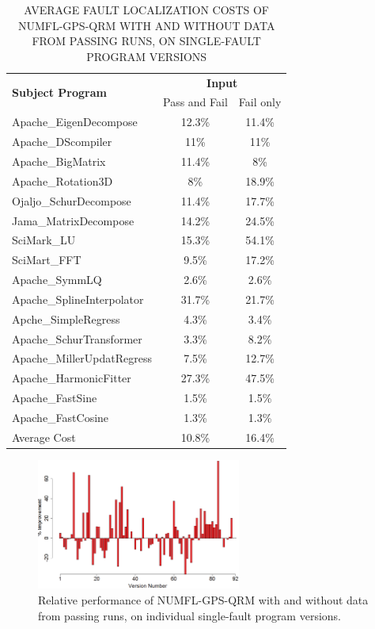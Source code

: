 \begin{table}[htbp!]
\caption{AVERAGE FAULT LOCALIZATION COSTS OF NUMFL-GPS-QRM WITH AND WITHOUT DATA FROM PASSING RUNS, ON SINGLE-FAULT PROGRAM VERSIONS}
\label{table3}
\centering
      \begin{tabular}{|l|c|c|}
      \hline
\multirow{2}{*}{{\bf Subject Program}}	&	\multicolumn{2}{|c|}{{\bf Input}}	\\	\cline{2-3}
& Pass and Fail	&Fail only \\ \hline
Apache\_EigenDecompose	&	12.3\%	&	11.4\%	\\	\hline
Apache\_DScompiler	&	11\%	&	11\%	\\	\hline
Apache\_BigMatrix	&	11.4\%	&	8\%	\\	\hline
Apache\_Rotation3D	&	8\%	&	18.9\%	\\	\hline
Ojaljo\_SchurDecompose	&	11.4\%	&	17.7\%	\\	\hline
Jama\_MatrixDecompose	&	14.2\%	&	24.5\%	\\	\hline
SciMark\_LU	&	15.3\%	&	54.1\%	\\	\hline
SciMart\_FFT	&	9.5\%	&	17.2\%	\\	\hline
Apache\_SymmLQ	&	2.6\%	&	2.6\%	\\	\hline
Apache\_SplineInterpolator	&	31.7\%	&	21.7\%	\\	\hline
Apche\_SimpleRegress	&	4.3\%	&	3.4\%	\\	\hline
Apache\_SchurTransformer	&	3.3\%	&	8.2\%	\\	\hline
Apache\_MillerUpdatRegress	&	7.5\%	&	12.7\%	\\	\hline
Apache\_HarmonicFitter	&	27.3\%	&	47.5\%	\\	\hline
Apache\_FastSine	&	1.5\%	&	1.5\%	\\	\hline
Apache\_FastCosine	&	1.3\%	&	1.3\%	\\	\hline
Average Cost	&	10.8\%	&	16.4\%	\\	\hline
\end{tabular}
\end{table}

\begin{figure}[!thpb]
\centering
\includegraphics[width=0.6\textwidth]{QRM_allFail.eps}
\caption{Relative performance of NUMFL-GPS-QRM with and without data from passing runs, on individual single-fault program versions.}
\label{QRM_allFail}
\end{figure}

